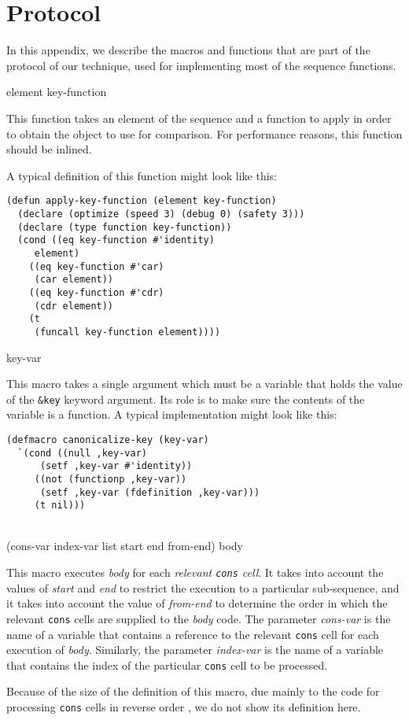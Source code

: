 \appendix

\section{Protocol}

In this appendix, we describe the macros and functions that are part
of the protocol of our technique, used for implementing most of the
sequence functions.

 {element key-function}

This function takes an element of the sequence and a function to apply
in order to obtain the object to use for comparison.  For performance
reasons, this function should be inlined.

A typical definition of this function might look like this:

{\small\begin{verbatim}
(defun apply-key-function (element key-function)
  (declare (optimize (speed 3) (debug 0) (safety 3)))
  (declare (type function key-function))
  (cond ((eq key-function #'identity)
	 element)
	((eq key-function #'car)
	 (car element))
	((eq key-function #'cdr)
	 (cdr element))
	(t
	 (funcall key-function element))))
\end{verbatim}}

 {key-var}

This macro takes a single argument which must be a variable that holds
the value of the \texttt{\&key} keyword argument.  Its role is to make
sure the contents of the variable is a function.  A typical
implementation might look like this:

{\small\begin{verbatim}
(defmacro canonicalize-key (key-var)
  `(cond ((null ,key-var)
	  (setf ,key-var #'identity))
	 ((not (functionp ,key-var))
	  (setf ,key-var (fdefinition ,key-var)))
	 (t nil)))
\end{verbatim}}

\\
{(cons-var index-var list start end from-end) \body body}

This macro executes \textit{body} for each \emph{relevant
  \texttt{cons} cell}.  It takes into account the values of
\textit{start} and \textit{end} to restrict the execution to a
particular sub-sequence, and it takes into account the value of
\textit{from-end} to determine the order in which the relevant
\texttt{cons} cells are supplied to the \textit{body} code.  The
parameter \textit{cons-var} is the name of a variable that contains a
reference to the relevant \texttt{cons} cell for each execution of
\textit{body}.  Similarly, the parameter \textit{index-var} is the
name of a variable that contains the index of the particular
\texttt{cons} cell to be processed.

Because of the size of the definition of this macro, due mainly to the
code for processing \texttt{cons} cells in reverse order
\cite{Durand:2015:ELS:reverse}, we do not show its definition here.
